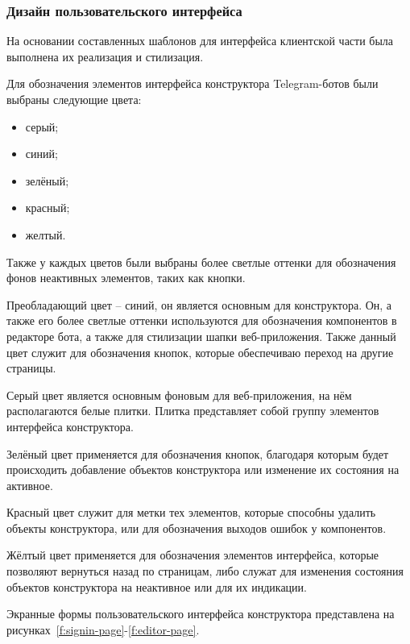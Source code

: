 
\subsubsection{Дизайн пользовательского интерфейса}

На основании составленных шаблонов для интерфейса клиентской части была выполнена
их реализация и стилизация.

Для обозначения элементов интерфейса конструктора Telegram-ботов были выбраны следующие цвета:
\begin{itemize}
	\item серый;
	\item синий;
	\item зелёный;
	\item красный;
	\item желтый.
\end{itemize}

Также у каждых цветов были выбраны более светлые оттенки для обозначения фонов неактивных элементов, таких как кнопки.

Преобладающий цвет – синий, он является основным для конструктора.
Он, а также его более светлые оттенки используются
для обозначения компонентов в редакторе бота,
а также для стилизации шапки веб-приложения.
Также данный цвет служит для обозначения кнопок, которые
обеспечиваю переход на другие страницы.

Серый цвет является основным фоновым для веб-приложения,
на нём располагаются белые плитки. Плитка представляет
собой группу элементов интерфейса конструктора.

Зелёный цвет применяется для обозначения кнопок,
благодаря которым будет происходить добавление объектов
конструктора или изменение их состояния на активное.

Красный цвет служит для метки тех элементов,
которые способны удалить объекты конструктора,
или для обозначения выходов ошибок у компонентов.

Жёлтый цвет применяется для обозначения элементов интерфейса,
которые позволяют вернуться назад по страницам,
либо служат для изменения состояния
объектов конструктора на неактивное или для их индикации.

Экранные формы пользовательского интерфейса конструктора представлена
на рисунках~\ref{f:signin-page}-\ref{f:editor-page}.

